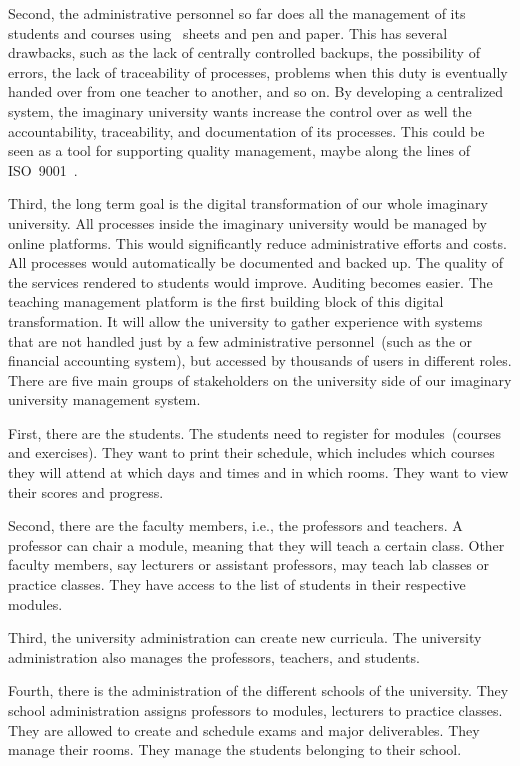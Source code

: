 Second, the administrative personnel so far does all the management of its students and courses using \microsoftExcel\ sheets and pen and paper.
This has several drawbacks, such as the lack of centrally controlled backups, the possibility of errors, the lack of traceability of processes, problems when this duty is eventually handed over from one teacher to another, and so on.
By developing a centralized system, the imaginary university wants increase the control over as well the accountability, traceability, and documentation of its processes.
This could be seen as a tool for supporting quality management, maybe along the lines of ISO~9001~\cite{ISO180912019,ISO90012015}.

Third, the long term goal is the digital transformation of our whole imaginary university.
All processes inside the imaginary university would be managed by online platforms.
This would significantly reduce administrative efforts and costs.
All processes would automatically be documented and backed up.
The quality of the services rendered to students would improve.
Auditing becomes easier.
The teaching management platform is the first building block of this digital transformation.
It will allow the university to gather experience with systems that are not handled just by a few administrative personnel~(such as the  or financial accounting system), but accessed by thousands of users in different roles.%
%
\endhsection%
%
%
%
There are five main groups of stakeholders on the university side of our imaginary university management system.

First, there are the students.
The students need to register for modules~(courses and exercises).
They want to print their schedule, which includes which courses they will attend at which days and times and in which rooms.
They want to view their scores and progress.

Second, there are the faculty members, i.e., the professors and teachers.
A professor can chair a module, meaning that they will teach a certain class.
Other faculty members, say lecturers or assistant professors, may teach lab classes or practice classes.
They have access to the list of students in their respective modules.

Third, the university administration can create new curricula.
The university administration also manages the professors, teachers, and students.

Fourth, there is the administration of the different schools of the university.
They school administration assigns professors to modules, lecturers to practice classes.
They are allowed to create and schedule exams and major deliverables.
They manage their rooms.
They manage the students belonging to their school.

